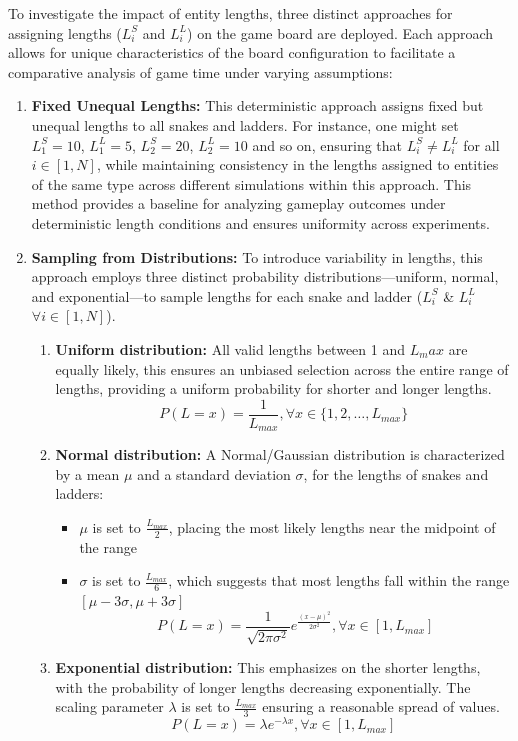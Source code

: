 \documentclass[12pt]{report}
\begin{document}
	To investigate the impact of entity lengths, three distinct approaches for assigning lengths ($L^S_i$ and $L^L_i$) on the game board are deployed. Each approach allows for unique characteristics of the board configuration to facilitate a comparative analysis of game time under varying assumptions:
	
	\begin{enumerate}
		\item \textbf{Fixed Unequal Lengths:} This deterministic approach assigns fixed but unequal lengths to all snakes and ladders. For instance, one might set $L^S_1 = 10$, $L^L_1 = 5$, $L^S_2 = 20$, $L^L_2 = 10$ and so on, ensuring that $L^S_i \neq L^L_i$ for all $i \in [1,N]$, while maintaining consistency in the lengths assigned to entities of the same type across different simulations within this approach. This method provides a baseline for analyzing gameplay outcomes under deterministic length conditions and ensures uniformity across experiments.
		
		\item \textbf{Sampling from Distributions:} To introduce variability in lengths, this approach employs three distinct probability distributions—uniform, normal, and exponential—to sample lengths for each snake and ladder ($L^S_i$ \& $L^L_i$ $\forall i \in [1, N]$).
		
		\begin{enumerate}
			\item \textbf{Uniform distribution: }All valid lengths between 1 and $L_max$ are equally likely, this ensures an unbiased selection across the entire range of lengths, providing a uniform probability for shorter and longer lengths.
			$$P(L=x)=\frac{1}{L_{max}}, \forall x \in \{1,2,\ldots,L_{max}\}$$
			\item \textbf{Normal distribution:} A Normal/Gaussian distribution is characterized by a mean $\mu$ and a standard deviation $\sigma$, for the lengths of snakes and ladders:
			\begin{itemize}
				\item $\mu$ is set to $\frac{L_{max}}{2}$, placing the most likely lengths near the midpoint of the range
				\item $\sigma$ is set to $\frac{L_{max}}{6}$, which suggests that most lengths fall within the range $[\mu-3\sigma, \mu+3\sigma]$
				$$P(L=x) = \frac{1}{\sqrt{2\pi\sigma^2}}{e^{\frac{(x-\mu)^2}{2\sigma^2}}, \forall x\in[1, L_{max}]}$$
			\end{itemize}
			\item \textbf{Exponential distribution: }This emphasizes on the shorter lengths, with the probability of longer lengths decreasing exponentially. The scaling parameter $\lambda$ is set to $\frac{L_{max}}{3}$ ensuring a reasonable spread of values.
			$$P(L=x)={\lambda}e^{{-\lambda}x}, \forall x \in [1, L_{max}]$$
		\end{enumerate}
		

\end{enumerate}
\end{document}
